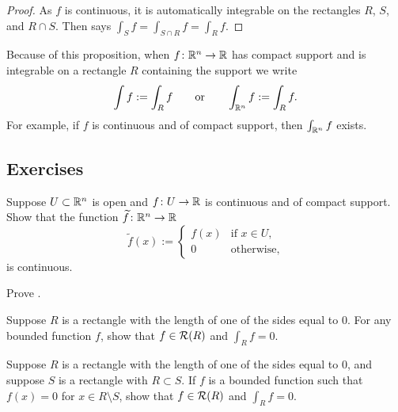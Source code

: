 \begin{proof}
As $f$ is continuous, it is automatically integrable on the rectangles $R$, $S$, and $R
\cap S$.
Then  says
$\int_S f = \int_{S \cap R} f = \int_R f$.
\end{proof}

Because of this proposition, when $f \colon {\mathbb{R}}^n \to {\mathbb{R}}$ has compact support
and is integrable on a rectangle $R$ containing the support we write
\begin{equation*}
\int f := \int_R f \qquad \text{or} \qquad 
\int_{{\mathbb{R}}^n} f := \int_R f .
\end{equation*}
For example, if $f$ is continuous and of compact support, then
$\int_{{\mathbb{R}}^n} f$ exists.

\subsection{Exercises}

\begin{exercise} \label{exercise:contcompactsupportRn}
Suppose $U \subset {\mathbb{R}}^n$ is open and $f \colon U \to {\mathbb{R}}$ is continuous and
of compact support.  Show that the function $\widetilde{f} \colon {\mathbb{R}}^n \to {\mathbb{R}}$
\begin{equation*}
\widetilde{f}(x) :=
\begin{cases}
f(x) & \text{if } x \in U, \\
0 & \text{otherwise,}
\end{cases}
\end{equation*}
is continuous.
\end{exercise}


\begin{exercise}
Prove .
\end{exercise}


\begin{exercise}
Suppose $R$ is a rectangle with the length of one of the sides equal to 0.
For any bounded function $f$, show that $f \in {\mathcal{R}}(R)$ and $\int_R f = 0$.
\end{exercise}

\begin{exercise} \label{mv:zerosiderectangle}
Suppose $R$ is a rectangle with the length of one of the sides equal to 0,
and suppose $S$ is a rectangle with $R \subset S$.  If $f$
is a bounded function such that $f(x) = 0$ for $x \in R \setminus S$, show
that $f \in {\mathcal{R}}(R)$ and $\int_R f = 0$.
\end{exercise}

